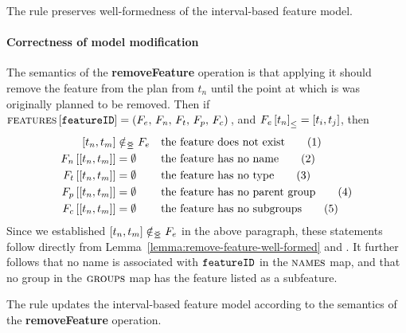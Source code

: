 \begin{lemma}
   The  rule preserves well-formedness of the interval-based feature model. 
   \label{lemma:remove-feature-well-formed}
\end{lemma}

\paragraph{Correctness of model modification}
The semantics of the \textbf{removeFeature} operation is that applying it should remove the feature from the plan from $t_n$ until the point at which is was originally planned to be removed. Then if $\textsc{features} \left[ \texttt{featureID} \right] = \left(F_e,\, F_n,\, F_t,\, F_p,\, F_c\right){}$, and $\containing{F_e}{t_n} = \interval{t_i}{t_j}$, then
\begin{align}
   \interval{t_n}{t_m} &\notinnr F_e && \text{the feature does not exist} \tag{1} \label{remove-feature1}\\
   \lookup{F_n}{\interval{t_n}{t_m}} &= \emptyset && \text{the feature has no name} \tag{2} \label{remove-feature2}\\
   \lookup{F_t}{\interval{t_n}{t_m}} &= \emptyset  && \text{the feature has no type} \tag{3} \label{remove-feature3}\\
   \lookup{F_p}{\interval{t_n}{t_m}} &= \emptyset  && \text{the feature has no parent group} \tag{4} \label{remove-feature4}\\
   \lookup{F_c}{\interval{t_n}{t_m}} &= \emptyset && \text{the feature has no subgroups} \tag{5} \label{remove-feature5}
\end{align}
Since we established $\interval{t_n}{t_m} \notinnr F_e$ in the above paragraph, these
statements follow directly from Lemma~\vref{lemma:remove-feature-well-formed} and . It further follows that no name is associated with $\texttt{featureID}$ in the $\textsc{names}{}$ map, and that no group in the $\textsc{groups}{}{}$ map has the feature listed as a subfeature.
\\

\begin{lemma}
   The  rule updates the interval-based feature model according to the semantics of the \textbf{removeFeature} operation.
   \label{lemma:remove-feature-mod}
\end{lemma}
